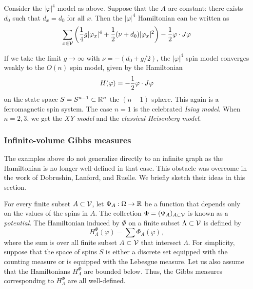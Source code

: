 Consider the $|\varphi|^4$ model as above. Suppose that the $A$ are constant:
there exists $d_0$ such that $d_x = d_0$ for all $x$.
Then the $|\varphi|^4$ Hamiltonian can be written as
\begin{equation}
\sum_{x\in\mathcal{V}}
\left(
  \frac{1}{4} g |\varphi_x|^4
    +
  \frac{1}{2} (\nu + d_0) |\varphi_x|^2
\right)
  -
\frac{1}{2} \varphi \cdot J \varphi
\end{equation}

If we take the limit $g\to\infty$ with $\nu = -(d_0 + g / 2)$, the
$|\varphi|^4$ spin model converges
weakly to the $O(n)$ spin model, given by the Hamiltonian
\begin{equation}
H(\varphi) = -\frac{1}{2} \varphi \cdot J \varphi
\end{equation}
on the state space $S = S^{n-1} \subset {\mathbb R}^n$ the $(n-1)$-sphere.
This again is a ferromagnetic spin system.
The case $n = 1$ is the celebrated \emph{Ising model}. When $n = 2, 3$,
we get the \emph{XY model} and the \emph{classical Heisenberg model}.


\subsubsection{Infinite-volume Gibbs measures}

The examples above do not generalize directly to an infinite graph as
the Hamiltonian is no longer well-defined in that case. This obstacle was overcome in the work
of Dobrushin, Lanford, and Ruelle. We briefly sketch their ideas in this section.

For every finite subset $A \subset \mathcal{V}$, let $\Phi_A : \Omega \rightarrow {\mathbb R}$ be a function that
depends only on the values of the spins in $A$. The collection $\Phi = (\Phi_A)_{A\subset\mathcal{V}}$
is known as a \emph{potential}. The Hamiltonian induced by $\Phi$ on a finite
subset $\Lambda \subset \mathcal{V}$ is defined by
\begin{equation}
H^\Phi_\Lambda(\varphi) = \sum \Phi_A(\varphi),
\end{equation}
where the sum is over all finite subset $A \subset \mathcal{V}$ that intersect $\Lambda$.
For simplicity, suppose that the space of spins $S$ is either a discrete set equipped with the
counting measure or is equipped with the Lebesgue measure. Let us also assume that the Hamiltonians
$H^\Phi_\Lambda$ are bounded below. Thus, the  Gibbs measures corresponding to $H^\Phi_\Lambda$ are
all well-defined.

